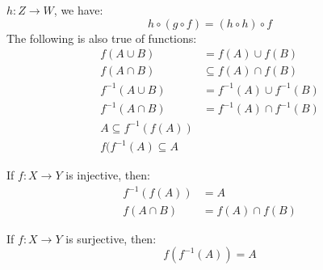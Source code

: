 \documentclass[crop=false,class=book,oneside]{standalone}
\begin{document}
            $h:Z\rightarrow{W}$, we have:
            \begin{equation}
                h\circ(g\circ{f})=(h\circ{h})\circ{f}
            \end{equation}
            The following is also true of functions:
            \begin{subequations}
                \begin{align}
                    f(A\cup{B})&=f(A)\cup{f}(B)\\
                    f(A\cap{B})&\subseteq{f}(A)\cap{f}(B)\\
                    f^{\minus{1}}(A\cup{B})
                        &=f^{\minus{1}}(A)\cup{f}^{\minus{1}}(B)\\
                    f^{\minus{1}}(A\cap{B})
                        &=f^{\minus{1}}(A)\cap{f}^{\minus{1}}(B)\\
                    A\subseteq{f}^{\minus{1}}(f(A))\\
                    f(f^{\minus{1}}(A)\subseteq{A}
                \end{align}
            \end{subequations}
            \begin{theorem}
                If $f:X\rightarrow{Y}$ is injective, then:
                \begin{subequations}
                    \begin{align}
                        f^{\minus{1}}(f(A))&=A\\
                        f(A\cap{B})&=f(A)\cap{f}(B)
                    \end{align}
                \end{subequations}
            \end{theorem}
            \begin{theorem}
                If $f:X\rightarrow{Y}$ is surjective, then:
                \begin{equation}
                    f(f^{\minus{1}}(A))=A
                \end{equation}
            \end{theorem}
\end{document}
